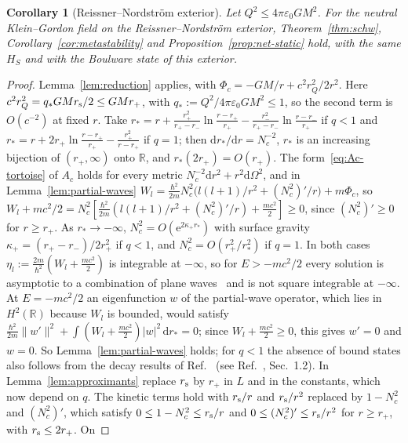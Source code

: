 \documentclass[%
 aip,
 jmp,
 amsmath,amssymb,
 reprint, onecolumn
]{revtex4-1}
\newtheorem{corollary}{Corollary}
\theoremstyle{definition}
\theoremstyle{remark}
\newcommand{\R}{\mathbb{R}}
\newcommand{\rmd}{\mathrm{d}}
\newcommand{\rme}{\mathrm{e}}
\begin{document}
\begin{corollary}[Reissner--Nordstr\"om exterior]\label{cor:RN}
Let $Q^2\leq4\pi\varepsilon_0GM^2$. For the neutral Klein--Gordon field on
the Reissner--Nordstr\"om exterior, Theorem~\ref{thm:schw},
Corollary~\ref{cor:metastability} and Proposition~\ref{prop:net-static}
hold, with the same $H_S$ and with the Boulware state of this exterior.
\end{corollary}

\begin{proof}
Lemma~\ref{lem:reduction} applies, with $\Phi_c=-GM/r+c^2r_Q^2/2r^2$. Here
$c^2r_Q^2=q_*GMr_{\rm s}/2\leq GMr_+$, with $q_*:=Q^2/4\pi\varepsilon_0GM^2
\leq1$, so the second term is $O(c^{-2})$ at fixed $r$. Take
$r_*=r+\frac{r_+^2}{r_+-r_-}\ln\frac{r-r_+}{r_+}-\frac{r_-^2}{r_+-r_-}
\ln\frac{r-r_-}{r_+}$ if $q<1$ and $r_*=r+2r_+\ln\frac{r-r_+}{r_+}-
\frac{r_+^2}{r-r_+}$ if $q=1$; then $\rmd r_*/\rmd r=N_c^{-2}$, $r_*$ is an
increasing bijection of $(r_+,\infty)$ onto $\R$, and $r_*(2r_+)=O(r_+)$.
The form~\eqref{eq:Ac-tortoise} of $A_c$ holds for every metric
$N_c^{-2}\rmd r^2+r^2\rmd\Omega^2$, and in Lemma~\ref{lem:partial-waves}
$W_l=\frac{\hbar^2}{2m}N_c^2\bigl(l(l+1)/r^2+(N_c^2)'/r\bigr)+m\Phi_c$, so
$W_l+mc^2/2=N_c^2[\frac{\hbar^2}{2m}(l(l+1)/r^2+(N_c^2)'/r)+
\frac{mc^2}{2}]\geq0$, since $(N_c^2)'\geq0$ for $r\geq r_+$. As
$r_*\to-\infty$, $N_c^2=O(\rme^{2\kappa_+r_*})$ with surface gravity
$\kappa_+=(r_+-r_-)/2r_+^2$ if $q<1$, and $N_c^2=O(r_+^2/r_*^2)$ if $q=1$.
In both cases $\eta_l:=\frac{2m}{\hbar^2}(W_l+\frac{mc^2}2)$ is integrable at
$-\infty$, so for $E>-mc^2/2$ every solution is asymptotic to a
combination of plane waves~\cite{Weidmann1987} and is not square
integrable at $-\infty$. At $E=-mc^2/2$ an eigenfunction $w$ of the
partial-wave operator, which lies in $H^2(\R)$ because $W_l$ is bounded,
would satisfy $\frac{\hbar^2}{2m}\|w'\|^2+\int(W_l+\frac{mc^2}2)|w|^2\,
\rmd r_*=0$; since $W_l+\frac{mc^2}2\geq0$, this gives $w'=0$ and $w=0$.
So Lemma~\ref{lem:partial-waves} holds; for $q<1$ the absence of bound
states also follows from the decay results of
Ref.~ (see
Ref.~, Sec.~1.2). In
Lemma~\ref{lem:approximants} replace $r_{\rm s}$ by $r_+$ in $L$ and in
the constants, which now depend on $q$. The kinetic terms hold with
$r_{\rm s}/r$ and $r_{\rm s}/r^2$ replaced by $1-N_c^2$ and $(N_c^2)'$,
which satisfy $0\leq1-N_c^2\leq r_{\rm s}/r$ and $0\leq(N_c^2)'\leq
r_{\rm s}/r^2$ for $r\geq r_+$, with $r_{\rm s}\leq2r_+$. On

\end{proof}
\end{document}
